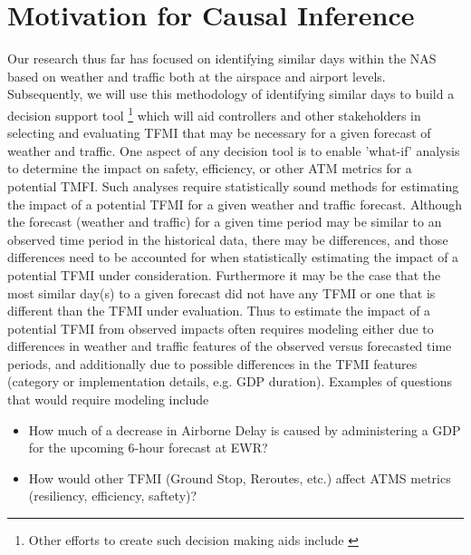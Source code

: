 \documentclass[11pt]{scrartcl}
\begin{document}


\section{Motivation for Causal Inference}
Our research thus far has focused on identifying similar days within the NAS based on weather and traffic both at the airspace and airport levels.  Subsequently, we will use this methodology of identifying similar days to build a decision support tool \footnote{Other efforts to create such decision making aids include \cite{pyrgiotis2011public}} which will aid controllers and other stakeholders in selecting and evaluating TFMI that may be necessary for a given forecast of weather and traffic.  One aspect of any decision tool is to enable 'what-if' analysis to determine the impact on safety, efficiency, or other ATM metrics for a potential TMFI.  Such analyses require statistically sound methods for estimating the impact of a potential TFMI for a given weather and traffic forecast.  Although the forecast (weather and traffic) for a given time period may be similar to an observed time period in the historical data, there may be differences, and those differences need to be accounted for when statistically estimating the impact of a potential TFMI under consideration.  Furthermore it may be the case that the most similar day(s) to a given forecast did not have any TFMI or one that is different than the TFMI under evaluation.   Thus to estimate the impact of a potential TFMI from observed impacts often requires modeling either due to differences in weather and traffic features of the observed versus forecasted time periods, and additionally due to possible differences in the TFMI features (category or implementation details, e.g. GDP duration). Examples of questions that would require modeling include
\begin{itemize}
\item  How much of a decrease in Airborne Delay is caused by administering a GDP for the upcoming 6-hour forecast at EWR?
\item How would other TFMI (Ground Stop, Reroutes, etc.) affect ATMS metrics (resiliency, efficiency, saftety)?
\end{itemize}
\end{document}
